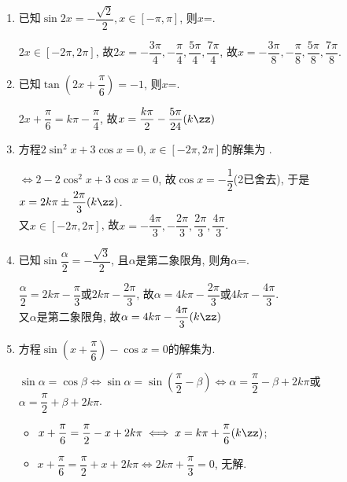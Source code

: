 \begin{enumerate}
\item 已知$\sin2x=-\dfrac{\sqrt2}{2}, x\in[-\pi,\pi]$, 则$x$=. 
\begin{jieda}
$2x\in[-2\pi,2\pi]$, 故$2x=-\dfrac{3\pi}{4},-\dfrac{\pi}{4},\dfrac{5\pi}{4},\dfrac{7\pi}{4}$, 
故$x=-\dfrac{3\pi}{8},-\dfrac{\pi}{8},\dfrac{5\pi}{8},\dfrac{7\pi}{8}$. 
\end{jieda}

\item 已知$\tan\left(2x+\dfrac{\pi}{6}\right)=-1$, 则$x$=. 
\begin{jieda}
$2x+\dfrac{\pi}{6}=k\pi-\dfrac{\pi}{4}$, 故$x=\dfrac{k\pi}{2}-\dfrac{5\pi}{24}(k\zz)$
\end{jieda}

\item 方程$2\sin^2x+3\cos{x}=0$, $x\in[-2\pi,2\pi]$的解集为 .
\begin{jieda}
$\iff 2-2\cos^2x+3\cos{x}=0$, 故$\cos{x}=-\dfrac{1}{2}$(2已舍去), 于是$x=2k\pi\pm\dfrac{2\pi}{3}(k\zz)$. \\
又$x\in[-2\pi,2\pi]$, 故$x=-\dfrac{4\pi}{3},-\dfrac{2\pi}{3},\dfrac{2\pi}{3},\dfrac{4\pi}{3}$. 
\end{jieda}

\item 已知$\sin\dfrac{\alpha}{2}=-\dfrac{\sqrt{3}}{2}$, 且$\alpha$是第二象限角, 则角$\alpha$=. 
\begin{jieda}
$\dfrac{\alpha}{2}=2k\pi-\dfrac{\pi}{3}$或$2k\pi-\dfrac{2\pi}{3}$, 故$\alpha=4k\pi-\dfrac{2\pi}{3}$或$4k\pi-\dfrac{4\pi}{3}$. \\
又$\alpha$是第二象限角, 故$\alpha=4k\pi-\dfrac{4\pi}{3}(k\zz)$
\end{jieda}


\item 方程$\sin\left(x+\dfrac{\pi}{6}\right)-\cos{x}=0$的解集为. 
\begin{jieda}
$\sin\alpha=\cos\beta\iff \sin\alpha=\sin\left(\dfrac{\pi}{2}-\beta\right)\iff
\alpha=\dfrac{\pi}{2}-\beta+2k\pi$或$\alpha=\dfrac{\pi}{2}+\beta+2k\pi$. 
\begin{itemize}
\item $x+\dfrac{\pi}{6}=\dfrac{\pi}{2}-x+2k\pi\iff x=k\pi+\dfrac{\pi}{6}(k\zz)$; 
\item $x+\dfrac{\pi}{6}=\dfrac{\pi}{2}+x+2k\pi\iff 2k\pi+\dfrac{\pi}{3}=0$, 无解. 
\end{itemize}
\end{jieda}



\end{enumerate}
